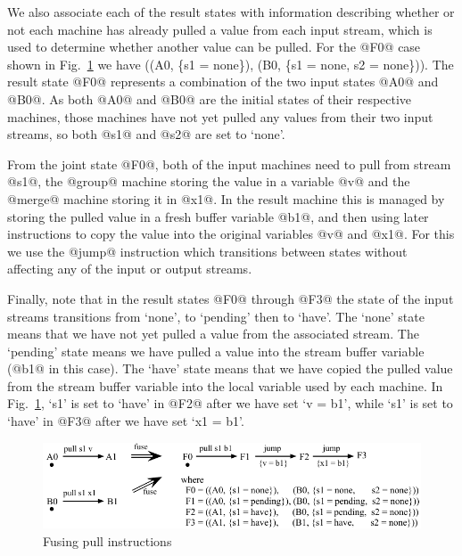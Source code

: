 We also associate each of the result states with information describing whether or not each machine has already pulled a value from each input stream, which is used to determine whether another value can be pulled. For the @F0@ case shown in Fig.~\ref{fig:Fusion:Pulls} we have ((A0, \{s1 = none\}), (B0, \{s1 = none, s2 = none\})). The result state @F0@ represents a combination of the two input states @A0@ and @B0@. As both @A0@ and @B0@ are the initial states of their respective machines, those machines have not yet pulled any values from their two input streams, so both @s1@ and @s2@ are set to `none'.

From the joint state @F0@, both of the input machines need to pull from stream @s1@, the @group@ machine storing the value in a variable @v@ and the @merge@ machine storing it in @x1@.
In the result machine this is managed by storing the pulled value in a fresh buffer variable @b1@, and then using later instructions to copy the value into the original variables @v@ and @x1@.
For this we use the @jump@ instruction which transitions between states without affecting any of the input or output streams.


Finally, note that in the result states @F0@ through @F3@ the state of the input streams transitions from `none', to `pending' then to `have'.
The `none' state means that we have not yet pulled a value from the associated stream.
The `pending' state means we have pulled a value into the stream buffer variable (@b1@ in this case).
The `have' state means that we have copied the pulled value from the stream buffer variable into the local variable used by each machine.
In Fig.~\ref{fig:Fusion:Pulls},  `s1' is set to `have' in @F2@ after we have set `v = b1', while `s1' is set to `have' in @F3@ after we have set `x1 = b1'. 


\begin{figure}
\includegraphics[scale=1.1]{figures/fuse-pull-pull.pdf}
\caption{Fusing pull instructions}
\label{fig:Fusion:Pulls}
\end{figure}


